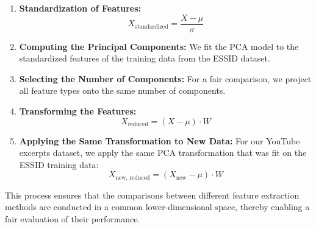 \begin{enumerate}
  \item \textbf{Standardization of Features:}
  \begin{equation}
    X_{\text{standardized}} = \frac{X - \mu}{\sigma}
    \label{eq:standardize}
  \end{equation}

  \item \textbf{Computing the Principal Components:} We fit the PCA model to the standardized features of the training data from the ESSID dataset.

  \item \textbf{Selecting the Number of Components:} For a fair comparison, we project all feature types onto the same number of components.

  \item \textbf{Transforming the Features:}
  \begin{equation}
    X_{\text{reduced}} = (X - \mu) \cdot W
    \label{eq:pca-transform}
  \end{equation}

  \item \textbf{Applying the Same Transformation to New Data:} For our YouTube excerpts dataset, we apply the same PCA transformation that was fit on the ESSID training data:
  \begin{equation}
    X_{\text{new, reduced}} = (X_{\text{new}} - \mu) \cdot W
    \label{eq:pca-new}
  \end{equation}
\end{enumerate}

This process ensures that the comparisons between different feature extraction methods are conducted in a common lower-dimensional space, thereby enabling a fair evaluation of their performance.
